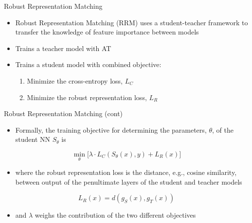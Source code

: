 \documentclass{beamer}
\begin{document}


\begin{frame}{Robust Representation Matching}
	
	\begin{itemize}
		\item Robust Representation Matching (RRM) uses a student-teacher framework to transfer the knowledge of feature importance between models
		\item Trains a teacher model with AT
		\item Trains a student model with combined objective:
		\begin{enumerate}
			\item Minimize the cross-entropy loss, $L_C$
			\item Minimize the robust representation loss, $L_R$
		\end{enumerate}
	\end{itemize}
	
\end{frame}



\begin{frame}{Robust Representation Matching (cont)}
	
	\begin{itemize}
		\item Formally, the training objective for determining the parameters, $\theta$, of the student NN $S_\theta$ is
	\end{itemize}

	$$\min_\theta \biggr [ \lambda \cdot L_C(S_\theta(x), y) + L_R(x) \biggr ]$$
	
	\begin{itemize}
		\item where the robust representation loss is the distance, e.g., cosine similarity, between output of the penultimate layers of the student and teacher models
	\end{itemize}

	$$L_R(x) = d(g_S(x), g_T(x))$$
	
		\begin{itemize}
			\item and $\lambda$ weighs the contribution of the two different objectives
		\end{itemize}
	
\end{frame}
\end{document}
